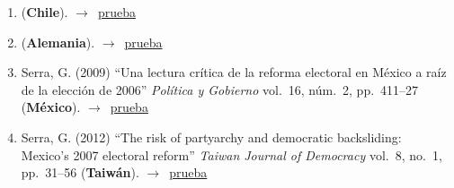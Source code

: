 \documentclass[12 pt, letter]{article}
\newenvironment{CitasMiTrabajo}{
    \begin{footnotesize}
    \begin{enumerate}[label={\footnotesize\emph{cita~\arabic*}},ref=\arabic*] %
        \setlength{\itemsep}{.1\itemsep}
        \setlength{\parskip}{.1\parskip}
    }{\end{enumerate}\end{footnotesize}}
\begin{document}
        \begin{CitasMiTrabajo}

        \item {} (\textbf{Chile}). $\rightarrow$~\href{https://github.com/emagar/cv/blob/master/citasMiTrab/magarRomero2007rcp/hdzhdzGeoespacialElecFCH2015.pdf}{prueba}

        \item {} (\textbf{Alemania}). $\rightarrow$~\href{https://github.com/emagar/cv/blob/master/citasMiTrab/magarRomero2007rcp/heisig2015.pdf}{prueba}

        \item Serra, G. (2009)
        ``Una lectura cr\'itica de la reforma electoral en M\'exico a ra\'iz de la elecci\'on de 2006''
        \emph{Pol\'itica y Gobierno} vol.\ 16, n\'um.\ 2, pp.\ 411--27
        (\textbf{M\'exico}). $\rightarrow$~\href{https://github.com/emagar/cv/blob/master/citasMiTrab/magarRomero2007rcp/serra2009pyg.pdf}{prueba}

        \item Serra, G. (2012)
            ``The risk of partyarchy and democratic backsliding: Mexico's 2007 electoral reform''
            \emph{Taiwan Journal of Democracy}
            vol.\ 8, no.\ 1, pp.\ 31--56 (\textbf{Taiw\'an}). $\rightarrow$~\href{https://github.com/emagar/cv/blob/master/citasMiTrab/estevezEtalElecStud/serraElecRefMexico2012tjd.pdf}{prueba}

        \label{ncites:magar.romero.rcp.2007} %

        \end{CitasMiTrabajo}



\end{document}
